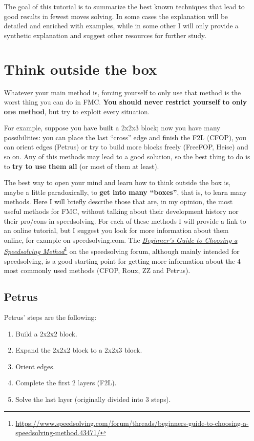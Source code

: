 \documentclass[11pt,a4paper]{book}
\begin{document}
The goal of this tutorial is to summarize the best known techniques that lead to good results in fewest moves solving. In some cases the explanation will be detailed and enriched with examples, while in some other I will only provide a synthetic explanation and suggest other resources for further study.

\chapter{Think outside the box}

Whatever your main method is, forcing yourself to only use that method is the worst thing you can do in FMC. \textbf{You should never restrict yourself to only one method}, but try to exploit every situation.

For example, suppose you have built a 2x2x3 block; now you have many possibilities: you can place the last ``cross'' edge and finish the F2L (CFOP), you can orient edges (Petrus) or try to build more blocks freely (FreeFOP, Heise) and so on. Any of this methods may lead to a good solution, so the best thing to do is to \textbf{try to use them all} (or most of them at least).

The best way to open your mind and learn how to think outside the box is, maybe a little paradoxically, to \textbf{get into many ``boxes''}, that is, to learn many methods. Here I will briefly describe those that are, in my opinion, the most useful methods for FMC, without talking about their development history nor their pro/cons in speedsolving. For each of these methods I will provide a link to an online tutorial, but I suggest you look for more information about them online, for example on speedsolving.com. The
\href{https://www.speedsolving.com/forum/threads/beginners-guide-to-choosing-a-speedsolving-method.43471/}{\emph{Beginner's Guide to Choosing a Speedsolving Method}}\footnote{\url{https://www.speedsolving.com/forum/threads/beginners-guide-to-choosing-a-speedsolving-method.43471/}} on the speedsolving forum, although mainly intended for speedsolving, is a good starting point for getting more information about the 4 most commonly used methods (CFOP, Roux, ZZ and Petrus).

\section{Petrus}

Petrus' steps are the following:
\begin{enumerate}
\item Build a 2x2x2 block.
\item Expand the 2x2x2 block to a 2x2x3 block.
\item Orient edges.
\item Complete the first 2 layers (F2L).
\item Solve the last layer (originally divided into 3 steps).
\end{enumerate}
\end{document}
